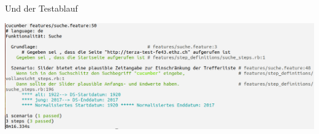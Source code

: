 \begin{frame}{Und der Testablauf}
  \begin{center}
    \includegraphics[width=1\textwidth]{pics/cucumber-test}
  \end{center}
\end{frame}
